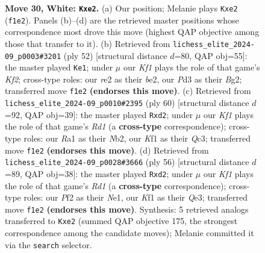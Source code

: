 \documentclass[11pt]{article}
\begin{document}
\begin{figure}[p]
\caption{\textbf{Move 30, White: \texttt{Kxe2}.} (a) Our position; Melanie plays \texttt{Kxe2} (\texttt{f1e2}). Panels (b)--(d) are the retrieved master positions whose correspondence most drove this move (highest QAP objective among those that transfer to it). (b) Retrieved from \texttt{lichess\_elite\_2024-09\_p0003\#3201} (ply 52) [structural distance $d$=80, QAP obj=55]: the master played \texttt{Ke1}; under $\mu$ our \emph{Kf1} plays the role of that game's \emph{Kf2}; cross-type roles: our \emph{r}e2 as their \emph{b}e2, our \emph{P}d3 as their \emph{B}g2; transferred move \texttt{f1e2} \textbf{(endorses this move)}. (c) Retrieved from \texttt{lichess\_elite\_2024-09\_p0010\#2395} (ply 60) [structural distance $d$=92, QAP obj=39]: the master played \texttt{Rxd2}; under $\mu$ our \emph{Kf1} plays the role of that game's \emph{Rd1} (a \textbf{cross-type} correspondence); cross-type roles: our \emph{R}a1 as their \emph{N}b2, our \emph{K}f1 as their \emph{Q}c3; transferred move \texttt{f1e2} \textbf{(endorses this move)}. (d) Retrieved from \texttt{lichess\_elite\_2024-09\_p0028\#3666} (ply 56) [structural distance $d$=89, QAP obj=38]: the master played \texttt{Rxd2}; under $\mu$ our \emph{Kf1} plays the role of that game's \emph{Rd1} (a \textbf{cross-type} correspondence); cross-type roles: our \emph{P}f2 as their \emph{N}e1, our \emph{K}f1 as their \emph{Q}e3; transferred move \texttt{f1e2} \textbf{(endorses this move)}. Synthesis: 5 retrieved analogs transferred to \texttt{Kxe2} (summed QAP objective 175, the strongest correspondence among the candidate moves); Melanie committed it via the \texttt{search} selector.}
\label{fig:thought-m58}
\end{figure}

\clearpage
\end{document}

